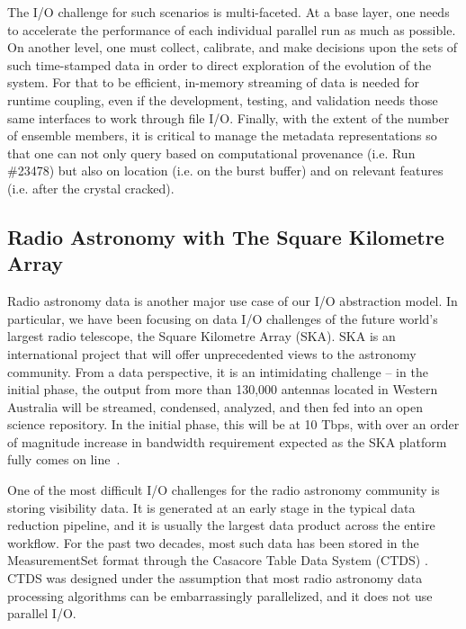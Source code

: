The I/O challenge for such scenarios is multi-faceted.  At a base layer, one needs to accelerate the performance of each individual parallel run as much as possible.  On another level, one must collect, calibrate, and make decisions upon the sets of such time-stamped data in order to direct exploration of the evolution of the system.  For that to be efficient, in-memory streaming of data is needed for runtime coupling, even if the development, testing, and validation needs those same interfaces to work through file I/O.  Finally, with the extent of the number of ensemble members, it is critical to manage the metadata representations so that one can not only query based on computational provenance (i.e. Run \#23478) but also on location (i.e. on the burst buffer) and on relevant features (i.e. after the crystal cracked).  






\subsection{Radio Astronomy with The Square Kilometre Array
}

Radio astronomy data is another major use case of our I/O abstraction model. In particular, we have been focusing on data I/O challenges of the future world's largest radio telescope, the Square Kilometre Array (SKA).  SKA is an international project that will offer unprecedented views to the astronomy community.  From a data perspective, it is an intimidating challenge -- in the initial phase, the output from more than 130,000 antennas located in Western Australia will be streamed, condensed, analyzed, and then fed into an open science repository.  In the initial phase, this will be at 10 Tbps, with over an order of magnitude increase in bandwidth requirement expected as the SKA platform fully comes on line~\cite{WANG2019}.

One of the most difficult I/O challenges for the radio astronomy community is storing visibility data. It is generated at an early stage in the typical data reduction pipeline, and it is usually the largest data product across the entire workflow. For the past two decades, most such data has been stored in the MeasurementSet format through the Casacore Table Data System (CTDS) \cite{DIEPEN2015}. CTDS was designed under the assumption that most radio astronomy data processing algorithms can be embarrassingly parallelized, and it does not use parallel I/O. 


